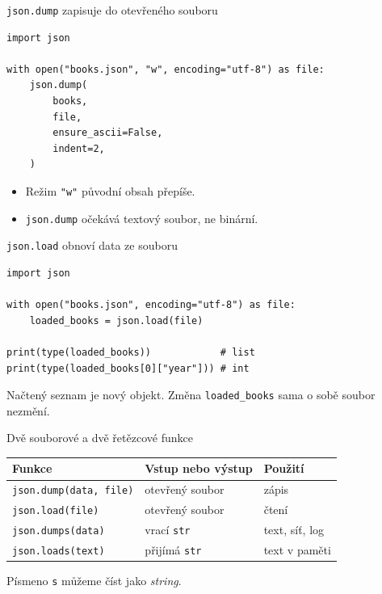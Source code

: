 \documentclass[aspectratio=169]{beamer}
\begin{document}
\begin{frame}[fragile]{\texttt{json.dump} zapisuje do otevřeného souboru}
\begin{lstlisting}[style=pythonSmall]
import json

with open("books.json", "w", encoding="utf-8") as file:
    json.dump(
        books,
        file,
        ensure_ascii=False,
        indent=2,
    )
\end{lstlisting}
  \begin{itemize}
    \item Režim \texttt{"w"} původní obsah přepíše.
    \item \texttt{json.dump} očekává textový soubor, ne binární.
  \end{itemize}
\end{frame}

\begin{frame}[fragile]{\texttt{json.load} obnoví data ze souboru}
\begin{lstlisting}[style=python]
import json

with open("books.json", encoding="utf-8") as file:
    loaded_books = json.load(file)

print(type(loaded_books))            # list
print(type(loaded_books[0]["year"])) # int
\end{lstlisting}
  Načtený seznam je nový objekt. Změna \texttt{loaded\_books} sama o sobě soubor nezmění.
\end{frame}

\begin{frame}{Dvě souborové a dvě řetězcové funkce}
  \centering
  \begin{tabular}{lll}
    \textbf{Funkce} & \textbf{Vstup nebo výstup} & \textbf{Použití} \\
    \hline
    \texttt{json.dump(data, file)} & otevřený soubor & zápis \\
    \texttt{json.load(file)} & otevřený soubor & čtení \\
    \texttt{json.dumps(data)} & vrací \texttt{str} & text, síť, log \\
    \texttt{json.loads(text)} & přijímá \texttt{str} & text v paměti \\
  \end{tabular}
  \vspace{6mm}

  Písmeno \texttt{s} můžeme číst jako \emph{string}.
\end{frame}
\end{document}
